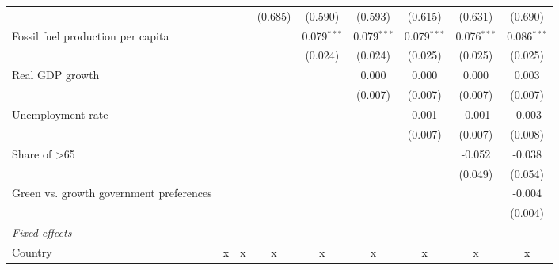 \begin{table}[htbp]
\begin{tabular}{lcccccccc}
                                                              &                &         & (0.685) & (0.590)       & (0.593)       & (0.615)       & (0.631)       & (0.690)\\   
      Fossil fuel production per capita                       &                &         &         & 0.079$^{***}$ & 0.079$^{***}$ & 0.079$^{***}$ & 0.076$^{***}$ & 0.086$^{***}$\\   
                                                              &                &         &         & (0.024)       & (0.024)       & (0.025)       & (0.025)       & (0.025)\\   
      Real GDP growth                                         &                &         &         &               & 0.000         & 0.000         & 0.000         & 0.003\\   
                                                              &                &         &         &               & (0.007)       & (0.007)       & (0.007)       & (0.007)\\   
      Unemployment rate                                       &                &         &         &               &               & 0.001         & -0.001        & -0.003\\   
                                                              &                &         &         &               &               & (0.007)       & (0.007)       & (0.008)\\   
      Share of >65                                            &                &         &         &               &               &               & -0.052        & -0.038\\   
                                                              &                &         &         &               &               &               & (0.049)       & (0.054)\\   
      Green vs. growth government preferences                 &                &         &         &               &               &               &               & -0.004\\   
                                                              &                &         &         &               &               &               &               & (0.004)\\   
      \emph{Fixed effects}\\
      Country                                                 & x              & x       & x       & x             & x             & x             & x             & x\\  

\end{tabular}
\end{table}
